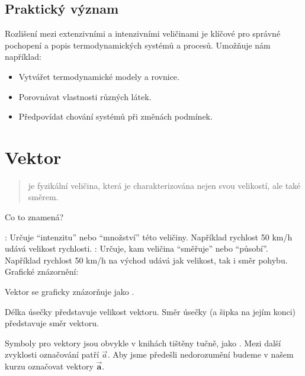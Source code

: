 \documentclass[letterpaper,10pt,english]{jupyterBook}
\begin{document}
\subsection{Praktický význam}
\label{\detokenize{Prednasky/0_2_Skal_xe1ry_a_vektory:prakticky-vyznam}}
\sphinxAtStartPar
Rozlišení mezi extenzivními a intenzivními veličinami je klíčové pro správné pochopení a popis termodynamických systémů a procesů. Umožňuje nám například:
\begin{itemize}
\item {} 
\sphinxAtStartPar
Vytvářet termodynamické modely a rovnice.

\item {} 
\sphinxAtStartPar
Porovnávat vlastnosti různých látek.

\item {} 
\sphinxAtStartPar
Předpovídat chování systémů při změnách podmínek.

\end{itemize}


\section{Vektor}
\label{\detokenize{Prednasky/0_2_Skal_xe1ry_a_vektory:vektor}}\begin{quote}

\sphinxAtStartPar
{} je fyzikální veličina, která je charakterizována nejen svou velikostí, ale také směrem.
\end{quote}

\sphinxAtStartPar
Co to znamená?

\sphinxAtStartPar
{}: Určuje “intenzitu” nebo “množství” této veličiny. Například rychlost 50 km/h udává velikost rychlosti.
: Určuje, kam veličina “směřuje” nebo “působí”. Například rychlost 50 km/h na východ udává jak velikost, tak i směr pohybu.
Grafické znázornění:

\sphinxAtStartPar
Vektor se graficky znázorňuje jako .

\sphinxAtStartPar
Délka úsečky představuje velikost vektoru.
Směr úsečky (a šipka na jejím konci) představuje směr vektoru.

\sphinxAtStartPar
Symboly pro vektory jsou obvykle v knihách tištěny tučně, jako . Mezi další zvyklosti označování patří \(\vec {a}\). Aby jsme předešli nedorozumění budeme v našem kurzu označovat vektory \(\vec{\mathbf{a}}\).
\end{document}
